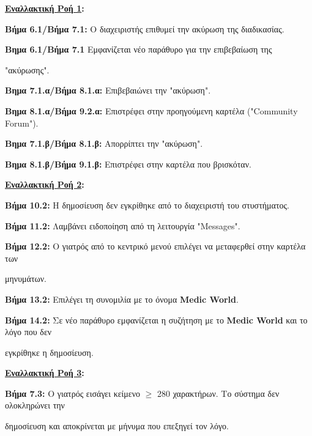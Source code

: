 \documentclass{article}
\begin{document}
\textbf{\underline{Εναλλακτική Ροή 1}:} \vspace{0.2cm}
\par \textbf{Βήμα 6.1/Βήμα 7.1:} Ο διαχειριστής επιθυμεί την ακύρωση της διαδικασίας.

\vspace{0.2cm}

\par \textbf{Βημα 6.1/Βήμα 7.1} Εμφανίζεται νέο παράθυρο για την επιβεβαίωση της \par "ακύρωσης". \vspace{0.1cm}
\par \textbf{Βημα 7.1.α/Βήμα 8.1.α:} Επιβεβαιώνει την "ακύρωση". \vspace{0.1cm}
\par \textbf{Βημα 8.1.α/Βήμα 9.2.α:} Επιστρέφει στην προηγούμενη καρτέλα ("Community Forum"). \vspace{0.2cm}

\par \textbf{Βημα 7.1.β/Βήμα 8.1.β:}  Απορρίπτει την "ακύρωση". \vspace{0.1cm}
\par \textbf{Βημα 8.1.β/Βήμα 9.1.β:} Επιστρέφει στην καρτέλα που βρισκόταν. \vspace{0.2cm}

\textbf{\underline{Εναλλακτική Ροή 2}:} \vspace{0.2cm}
\par \textbf{Βήμα 10.2:} Η δημοσίευση δεν εγκρίθηκε από το διαχειριστή του στυστήματος. \vspace{0.1cm}
\par \textbf{Βήμα 11.2:} Λαμβάνει ειδοποίηση από τη λειτουργία "Messages". \vspace{0.1cm}
\par \textbf{Βήμα 12.2:} Ο γιατρός από το κεντρικό μενού επιλέγει να μεταφερθεί στην καρτέλα των \par μηνυμάτων. \vspace{0.1cm}
\par \textbf{Βήμα 13.2:} Επιλέγει τη συνομιλία με το όνομα \textbf{Medic World}. \vspace{0.1cm}
\par \textbf{Βήμα 14.2:} Σε νέο παράθυρο εμφανίζεται η συζήτηση με το \textbf{Medic World} και το λόγο που δεν \par εγκρίθηκε η δημοσίευση. \vspace{0.2cm}

\textbf{\underline{Εναλλακτική Ροή 3}:} \vspace{0.2cm}
\par \textbf{Βήμα 7.3:} Ο γιατρός εισάγει κείμενο $\ge$ 280 χαρακτήρων. Το σύστημα δεν ολοκληρώνει την \par δημοσίευση και αποκρίνεται με μήνυμα που επεξηγεί τον λόγο. \vspace{0.2cm}
\end{document}
